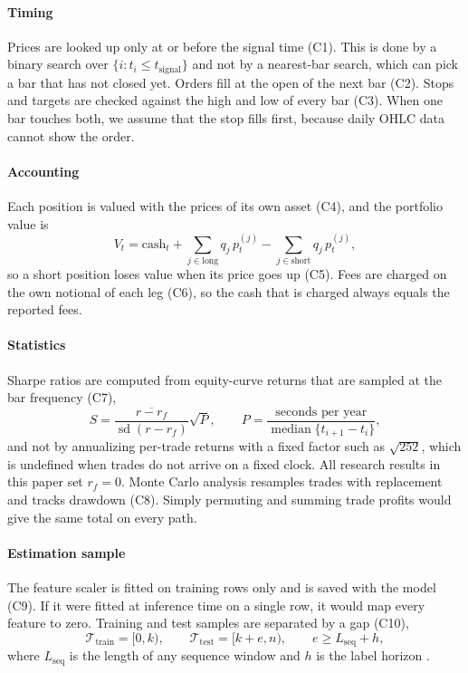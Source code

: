 \documentclass[preprint,12pt,authoryear,a4paper]{elsarticle}
\begin{document}
\paragraph{Timing} Prices are looked up only at or before the signal time (C1).
This is done by a binary search over $\{i: t_i\le t_{\text{signal}}\}$ and not by a
nearest-bar search, which can pick a bar that has not closed yet. Orders fill at the
open of the next bar (C2). Stops and targets are checked against the high and low
of every bar (C3). When one bar touches both, we assume that the stop fills first,
because daily OHLC data cannot show the order.

\paragraph{Accounting} Each position is valued with the prices of its own asset
(C4), and the portfolio value is
\begin{equation}
V_t=\text{cash}_t+\sum_{j\in\text{long}} q_j\,p^{(j)}_t-\sum_{j\in\text{short}} q_j\,p^{(j)}_t ,
\label{eq:equity}
\end{equation}
so a short position loses value when its price goes up (C5). Fees are charged on the
own notional of each leg (C6), so the cash that is charged always equals the
reported fees.

\paragraph{Statistics} Sharpe ratios are computed from equity-curve returns that
are sampled at the bar frequency (C7),
\begin{equation}
S=\frac{\overline{r-r_f}}{\operatorname{sd}(r-r_f)}\sqrt{P},
\qquad
P=\frac{\text{seconds per year}}{\operatorname{median}\{t_{i+1}-t_i\}},
\label{eq:sharpe}
\end{equation}
and not by annualizing per-trade returns with a fixed factor such as $\sqrt{252}$,
which is undefined when trades do not arrive on a fixed clock. All research results
in this paper set $r_f=0$. Monte Carlo analysis resamples trades with replacement
and tracks drawdown (C8). Simply permuting and summing trade profits would give the
same total on every path.

\paragraph{Estimation sample} The feature scaler is fitted on training rows only
and is saved with the model (C9). If it were fitted at inference time on a single
row, it would map every feature to zero. Training and test samples are separated by
a gap (C10),
\begin{equation}
\mathcal{T}_{\text{train}}=[0,k),\qquad
\mathcal{T}_{\text{test}}=[k+e,n),\qquad
e\ge L_{\text{seq}}+h,
\label{eq:embargo}
\end{equation}
where $L_{\text{seq}}$ is the length of any sequence window and $h$ is the label
horizon \citep{lopezdeprado2018advances}.
\end{document}
